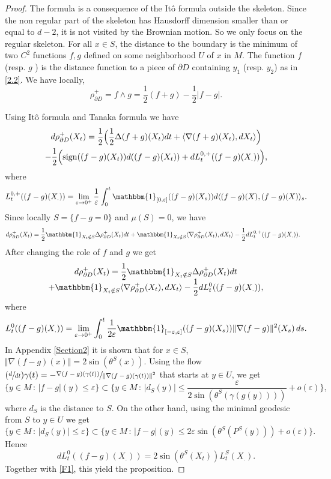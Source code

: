 \documentclass[10pt]{amsart}
\newcommand{\Psfrac}[2]{(\sfrac{#1}{#2})}
\theoremstyle{plain}
\theoremstyle{definition}
\newcommand{\sign}{\mathrm{sign}}
\newcommand{\st}{\,:\,}
\newcommand{\un}{\mathbbm{1}}
\let\D\Delta
\let\e\varepsilon
\let\n\nabla
\begin{document}
\begin{proof}
The formula is a consequence of the Itô formula outside the skeleton.
Since the non regular part of the skeleton has Hausdorff dimension smaller than or equal to $d-2$, it is not visited by the Brownian motion. So we only focus on the regular skeleton. For all $x \in S$, the distance to the boundary is the minimum of two $C^2$ functions $ f,g$ defined on some neighborhood $U$ of $ x$ in $M$. The function $f$ (resp. $g$ ) is the distance function to a piece of $\partial D $ containing $y_1 $ (resp. $ y_2$) as in \eqref{2.2}.
We have locally,
\[
\rho^{+}_{\partial D} = f \wedge g = \frac12 (f +g ) -\frac12 \vert f-g \vert.
\]

Using Itô formula and Tanaka formula we have
\begin{multline*}
d\rho^{+}_{\partial D}(X_t) = \frac12 \Big(\frac12 \D (f+g)(X_t) dt +\langle \n (f+g) (X_t), dX_t \rangle \Big)\\
- \frac12 \Bigl(\sign ((f-g)(X_t))d((f-g)(X_t)) + dL^{0,+}_t((f-g)(X_.))\Bigr),
\end{multline*}
where
\[
L^{0,+}_t((f-g)(X_.))= \lim_{\e \to 0^+} \frac{1}{\e}\int_0^t \un_{[0,\e]} ((f-g)(X_s)) d\langle (f-g)(X),(f-g)(X) \rangle_s.
\]
Since locally $S = \{f-g =0 \}$ and $ \mu(S)=0$, we have
\begin{align*}
d\rho^{+}_{\partial D}(X_t) &= \frac12 \un_{X_t \notin S} \D \rho^{+}_{\partial D}(X_t) dt + \un_{X_t \notin S} \langle \n\rho^{+}_{\partial D}(X_t), dX_t \rangle -\frac12 dL^{0,+}_t((f-g)(X_.)).
\end{align*}
After changing the role of $ f$ and $g$ we get
\begin{multline}\label{F1}
d\rho^{+}_{\partial D}(X_t) = \frac12 \un_{X_t \notin S} \D \rho^{+}_{\partial D}(X_t) dt\\[-5pt]
+ \un_{X_t \notin S} \langle \n\rho^{+}_{\partial D}(X_t), dX_t \rangle -\frac12 dL^{0}_t((f-g)(X_.)),
\end{multline}
where
\[
L^{0}_t((f-g)(X_.))= \lim_{\e \to 0^+} \int_0^t\frac{1}{2\e} \un_{[-\e,\e]} ((f-g)(X_s)) \Vert \n (f-g)\Vert^2 (X_s)\, ds.
\]
In Appendix \ref{Section2} it is shown that for $x \in S$, $\Vert \n (f-g)(x) \Vert = 2 \sin\left(\theta^{S}(x)\right) $.
Using the flow $ \Psfrac{d}{dt} \gamma(t) = - \sfrac{\n (f-g)(\gamma(t))}{\Vert \n (f-g)(\gamma(t))\Vert^2} $ that starts at $y\in U$, we get
\[
\{y \in M\st \vert f-g \vert(y) \le \e \} \subset \{y \in M\st \vert d_S(y) \vert \le \frac{\e}{2\sin\left(\theta^{S}(\gamma(g(y)))\right)} + o(\e)\},
\]
where $d_{S}$ is the distance to $ S$.
On the other hand, using the minimal geodesic from $S$ to $y \in U$
we get
\[
\{y \in M\st \vert d_S(y) \vert \le \e \} \subset \bigl\{y \in M\st \vert f-g \vert(y) \le 2 \e \sin\left(\theta^{S}(P^S(y))\right) + o(\e)\bigr\}.
\]
Hence
\[
dL^{0}_t((f-g)(X_.)) = 2\sin\left(\theta^{S}(X_t)\right) L_t^S(X_.).
\]
Together with \eqref{F1}, this yield the proposition.
\end{proof}
\end{document}
